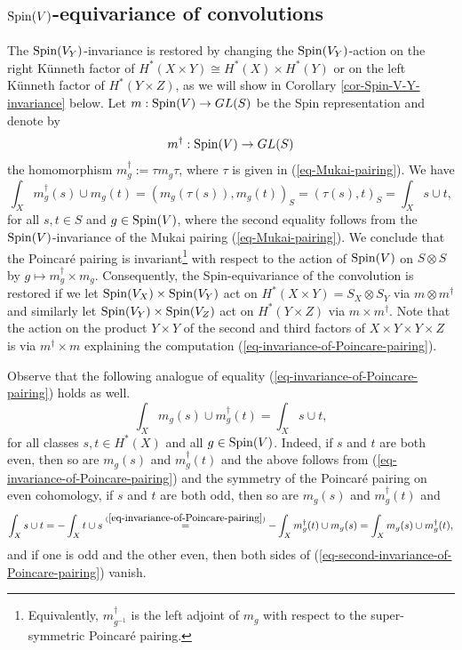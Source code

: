 \documentclass[12pt]{amsart}
\numberwithin{equation}{subsection}
\theoremstyle{plain}
\theoremstyle{definition}
\newcommand{\Spin}{{\rm Spin}}
\begin{document}
% 
\subsection{$\Spin(V)$-equivariance of convolutions}
\label{sec-Spin-eqivariance-of-convolutions}
The $\Spin(V_Y)$-invariance is restored by changing the $\Spin(V_Y)$-action on the right K\"{u}nneth factor of
$H^*(X\times Y)\cong H^*(X)\times H^*(Y)$ or on the left K\"{u}nneth factor of $H^*(Y\times Z)$, as we will show in Corollary \ref{cor-Spin-V-Y-invariance} below.
Let $m:\Spin(V)\rightarrow GL(S)$ be the Spin representation and denote by
\begin{equation}
\label{eq-m-dagger}
m^\dagger: \Spin(V)\rightarrow GL(S)
\end{equation}
the homomorphism $m^\dagger_g:=\tau m_g\tau$, where $\tau$ is given in (\ref{eq-Mukai-pairing}). We have
\begin{equation}
\label{eq-invariance-of-Poincare-pairing}
\int_X m^\dagger_g(s)\cup m_g(t)=(m_g(\tau(s)),m_g(t))_S=(\tau(s),t)_S=\int_X s\cup t,
\end{equation}
for all $s,t\in S$ and $g\in \Spin(V)$, 
where the second equality follows from the $\Spin(V)$-invariance of the Mukai pairing (\ref{eq-Mukai-pairing}). We conclude that the Poincar\'{e} pairing is invariant\footnote{Equivalently, $m_{g^{-1}}^\dagger$ is the left adjoint of $m_g$ with respect to the super-symmetric Poincar\'{e} pairing.}
with respect to the action of $\Spin(V)$ on $S\otimes S$ by
$g\mapsto m^\dagger_g\times m_g.$
Consequently, the Spin-equivariance of the convolution is restored if we let $\Spin(V_X)\times \Spin(V_Y)$ act on $H^*(X\times Y)=S_X\otimes S_Y$ via $m\otimes m^\dagger$ and similarly 
let $\Spin(V_Y)\times \Spin(V_Z)$ act on $H^*(Y\times Z)$ via $m\times m^\dagger$. Note that the action on the product $Y\times Y$ of the second and third factors of $X\times Y \times Y \times Z$ is via
$m^\dagger\times m$ explaining the computation (\ref{eq-invariance-of-Poincare-pairing}).

Observe that the following analogue of equality (\ref{eq-invariance-of-Poincare-pairing}) holds as well.
\begin{equation}
\label{eq-second-invariance-of-Poincare-pairing}
\int_X m_g(s)\cup m^\dagger_g(t)=\int_X s\cup t,
\end{equation}
for all classes $s,t\in H^*(X)$ and all $g\in \Spin(V)$. Indeed, if $s$ and $t$ are both even, then so are $m_g(s)$ and $m^\dagger_g(t)$ and the above follows from 
(\ref{eq-invariance-of-Poincare-pairing}) and the symmetry of the Poincar\'{e} pairing on even cohomology, if $s$ and $t$ are both odd, then so are $m_g(s)$ and $m^\dagger_g(t)$ and
\[
\int_X s\cup t=-\int_X t\cup s\stackrel{(\ref{eq-invariance-of-Poincare-pairing})}{=}
-\int_X m_g^\dagger(t)\cup m_g(s)=\int_X m_g(s)\cup m^\dagger_g(t),
\]
and if one is odd and the other even, then both sides of (\ref{eq-second-invariance-of-Poincare-pairing}) vanish. 
\end{document}
